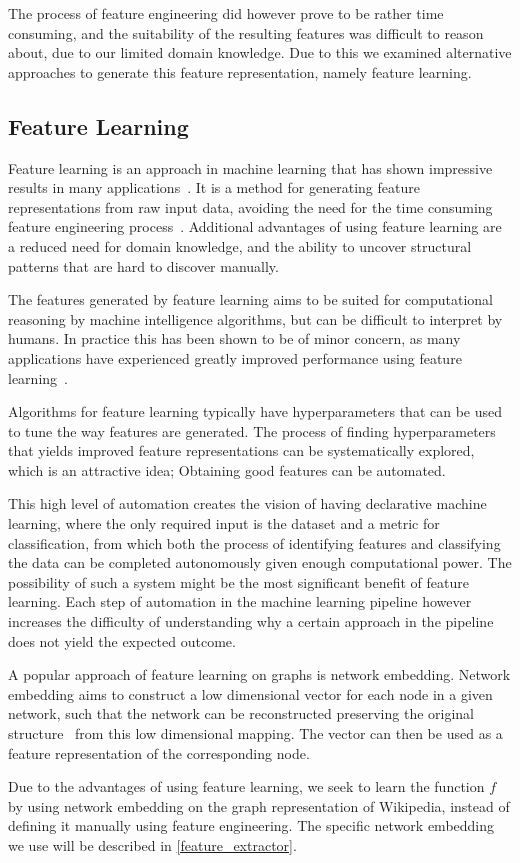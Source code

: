 The process of feature engineering did however prove to be rather time consuming, and the suitability of the resulting features was difficult to reason about, due to our limited domain knowledge. Due to this we examined alternative approaches to generate this feature representation, namely feature learning.


\subsection{Feature Learning}
Feature learning is an approach in machine learning that has shown impressive results in many applications~\cite{bengio2013representation}. It is a method for generating feature representations from raw input data, avoiding the need for the time consuming feature engineering process~\cite{ng-lecture}. Additional advantages of using feature learning are a reduced need for domain knowledge, and the ability to uncover structural patterns that are hard to discover manually.

The features generated by feature learning aims to be suited for computational reasoning by machine intelligence algorithms, but can be difficult to interpret by humans. In practice this has been shown to be of minor concern, as many applications have experienced greatly improved performance using feature learning~\cite{bengio2013representation}.

Algorithms for feature learning typically have hyperparameters that can be used to tune the way features are generated. The process of finding hyperparameters that yields improved feature representations can be systematically explored, which is an attractive idea; Obtaining good features can be automated.

This high level of automation creates the vision of having declarative machine learning, where the only required input is the dataset and a metric for classification, from which both the process of identifying features and classifying the data can be completed autonomously given enough computational power. The possibility of such a system might be the most significant benefit of feature learning. Each step of automation in the machine learning pipeline however increases the difficulty of understanding why a certain approach in the pipeline does not yield the expected outcome.

A popular approach of feature learning on graphs is network embedding. Network embedding aims to construct a low dimensional vector for each node in a given network, such that the network can be reconstructed preserving the original structure~\cite{sun2016general} from this low dimensional mapping. The vector can then be used as a feature representation of the corresponding node.

Due to the advantages of using feature learning, we seek to learn the function $f$ by using network embedding on the graph representation of Wikipedia, instead of defining it manually using feature engineering. The specific network embedding we use will be described in \cref{feature_extractor}.
